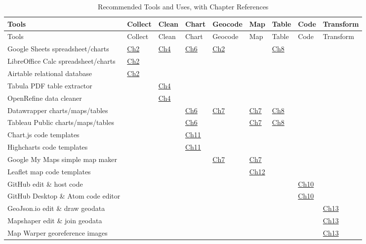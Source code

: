 \documentclass[
  english,
]{book}
\begin{document}
\begin{longtable}[]{@{}lllllllll@{}}
\caption{\label{tab:tools} Recommended Tools and Uses, with Chapter References}\tabularnewline
\toprule
Tools & Collect & Clean & Chart & Geocode & Map & Table & Code & Transform \\
\midrule
\endfirsthead
\toprule
Tools & Collect & Clean & Chart & Geocode & Map & Table & Code & Transform \\
\midrule
\endhead
Google Sheets spreadsheet/charts & \href{spreadsheet-tools.html}{Ch2} & \href{clean.html}{Ch4} & \href{chart-google.html}{Ch6} & \href{geocode.html}{Ch2} & & \href{table.html}{Ch8} & & \\
LibreOffice Calc spreadsheet/charts & \href{spreadsheet-tools.html}{Ch2} & & & & & & & \\
Airtable relational database & \href{database.html}{Ch2} & & & & & & & \\
Tabula PDF table extractor & & \href{tabula.html}{Ch4} & & & & & & \\
OpenRefine data cleaner & & \href{open-refine.html}{Ch4} & & & & & & \\
Datawrapper charts/maps/tables & & & \href{chart-datawrapper.html}{Ch6} & \href{symbolmap-datawrapper.html}{Ch7} & \href{symbolmap-datawrapper.html}{Ch7} & \href{table-datawrapper.html}{Ch8} & & \\
Tableau Public charts/maps/tables & & & \href{chart-tableau.html}{Ch6} & & \href{map-tableau.html}{Ch7} & \href{table.html}{Ch8} & & \\
Chart.js code templates & & & \href{chartcode.html}{Ch11} & & & & & \\
Highcharts code templates & & & \href{chartcode.html}{Ch11} & & & & & \\
Google My Maps simple map maker & & & & \href{mymaps.html}{Ch7} & \href{mymaps.html}{Ch7} & & & \\
Leaflet map code templates & & & & & \href{leaflet.html}{Ch12} & & & \\
GitHub edit \& host code & & & & & & & \href{github.html}{Ch10} & \\
GitHub Desktop \& Atom code editor & & & & & & & \href{github-desktop-atom.html}{Ch10} & \\
GeoJson.io edit \& draw geodata & & & & & & & & \href{geojsonio.html}{Ch13} \\
Mapshaper edit \& join geodata & & & & & & & & \href{mapshaper.html}{Ch13} \\
Map Warper georeference images & & & & & & & & \href{mapwarper.html}{Ch13} \\
\bottomrule
\end{longtable}
\end{document}
